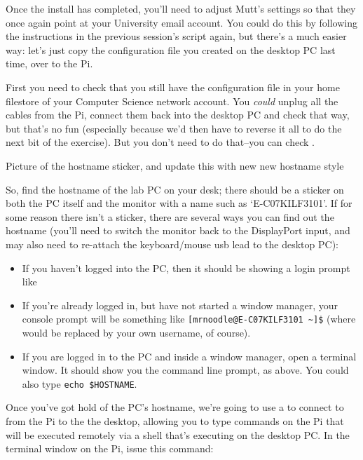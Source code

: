 Once the install has completed, you'll need to adjust Mutt's settings so that they once again point at your University email account. You could do this by following the instructions in the previous session's script again, but there's a much easier way: let's just copy the configuration file you created on the desktop PC last time, over to the Pi. 

First you need to check that you still have the  configuration file in your home filestore of your Computer Science network account. You \textit{could} unplug all the cables from the Pi, connect them back into the desktop PC and check that way, but that's no fun (especially because we'd then have to reverse it all to do the next bit of the exercise). But you don't need to do that--you can check . 

\begin{note}
Picture of the hostname sticker, and update this with new new hostname style
\end{note}

So, find the hostname of the lab PC on your desk; there should be a sticker on both the PC itself and the monitor with a name such as `E-C07KILF3101'. If for some reason there isn't a sticker, there are several ways you can find out the hostname (you'll need to switch the monitor back to the DisplayPort input, and may also need to re-attach the keyboard/mouse usb lead to the desktop PC):

\begin{itemize}
\item If you haven't logged into the PC, then it should be showing a login prompt like  
\item If you're already logged in, but have not started a window manager, your console prompt will be something like  \verb|[mrnoodle@E-C07KILF3101 ~]$| (where  would be replaced by your own username, of course).
\item If you are logged in to the PC and inside a window manager, open a terminal window. It should show you the command line prompt, as above. You could also type \verb|echo $HOSTNAME|.
\end{itemize}

Once you've got hold of the PC's hostname, we're going to use a  to connect to from the Pi to the the desktop, allowing you to type commands on the Pi that will be executed remotely via a shell that's executing on the desktop PC. In the terminal window on the Pi, issue this command:

